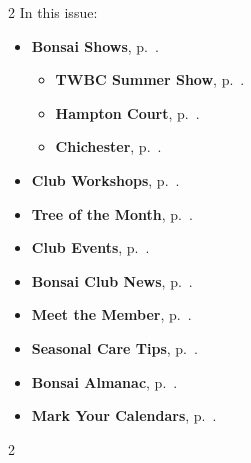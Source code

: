 \setlength{\columnsep}{-5.0cm}
\begin{multicols}{2}
    \noindent\textsf{In this issue:}
    \begin{itemize}
        \item \textsf{\textbf{Bonsai Shows}}, p.~\pageref{2025-07-show}.
        \begin{itemize}
            \item \textsf{\textbf{TWBC Summer Show}}, p.~\pageref{2025-07-show}.
            \item \textsf{\textbf{Hampton Court}}, p.~\pageref{2025-07-show}.
            \item \textsf{\textbf{Chichester}}, p.~\pageref{2025-07-show}.
        \end{itemize}
        \item \textsf{\textbf{Club Workshops}}, p.~\pageref{2025-07-workshop}.
        \item \textsf{\textbf{Tree of the Month}}, p.~\pageref{2025-07-contest}.
        \item \textsf{\textbf{Club Events}}, p.~\pageref{2025-07-calendar}.
        \item \textsf{\textbf{Bonsai Club News}}, p.~\pageref{2025-07-news}.
        \item \textsf{\textbf{Meet the Member}}, p.~\pageref{2025-07-roots}.
        \item \textsf{\textbf{Seasonal Care Tips}}, p.~\pageref{2025-07-care}.
        \item \textsf{\textbf{Bonsai Almanac}}, p.~\pageref{2025-07-itoigawa}.
        \item \textsf{\textbf{Mark Your Calendars}}, p.~\pageref{2025-07-events}.
    \end{itemize}
    \vfill\null
    \columnbreak

    
\end{multicols}
\pagebreak

\setlength{\columnsep}{0.5cm}
\begin{multicols}{2}
    
    
    
    
    
    
    
    
    
    
    
\end{multicols}
